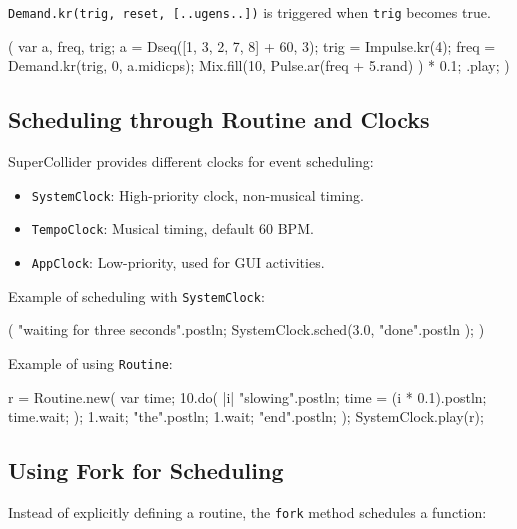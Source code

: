 \texttt{Demand.kr(trig, reset, [..ugens..])} is triggered when \texttt{trig} becomes true.

\begin{supercollider*}
(
{
    var a, freq, trig;
    a = Dseq([1, 3, 2, 7, 8] + 60, 3);
    trig = Impulse.kr(4);
    freq = Demand.kr(trig, 0, a.midicps);
    Mix.fill(10, { Pulse.ar(freq + 5.rand) }) * 0.1;
}.play;
)
\end{supercollider*}

\subsection{Scheduling through Routine and Clocks}

SuperCollider provides different clocks for event scheduling:

\begin{itemize}
    \item \texttt{SystemClock}: High-priority clock, non-musical timing.
    \item \texttt{TempoClock}: Musical timing, default 60 BPM.
    \item \texttt{AppClock}: Low-priority, used for GUI activities.
\end{itemize}

Example of scheduling with \texttt{SystemClock}:

\begin{supercollider*}
(
"waiting for three seconds".postln;
SystemClock.sched(3.0, { "done".postln });
)
\end{supercollider*}

Example of using \texttt{Routine}:

\begin{supercollider*}
r = Routine.new({
    var time;
    10.do({ |i| 
        "slowing".postln;
        time = (i * 0.1).postln;
        time.wait;
    });
    1.wait;
    "the".postln;
    1.wait;
    "end".postln;
});
SystemClock.play(r);
\end{supercollider*}

\subsection{Using Fork for Scheduling}

Instead of explicitly defining a routine, the \texttt{fork} method schedules a function:

